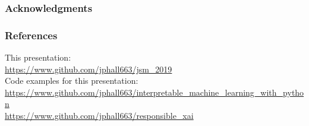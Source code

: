 \documentclass[11pt,
               aspectratio=169,
               hyperref={colorlinks}
               ]{beamer}
\begin{document}
\begin{frame}
	
	\frametitle{Acknowledgments}
	
	
\end{frame}	


	\begin{frame}[t, allowframebreaks]
	
		\frametitle{References}	
		
			This presentation:\\
			\tiny{\url{https://www.github.com/jphall663/jsm_2019}}\\
			\vspace{10pt}
			\normalsize Code examples for this presentation:\\
			\tiny{\url{https://www.github.com/jphall663/interpretable_machine_learning_with_python}}\\
			\noindent\tiny{\url{https://www.github.com/jphall663/responsible_xai}}
								
		\framebreak		
		
		\printbibliography
		
	\end{frame}
\end{document}

